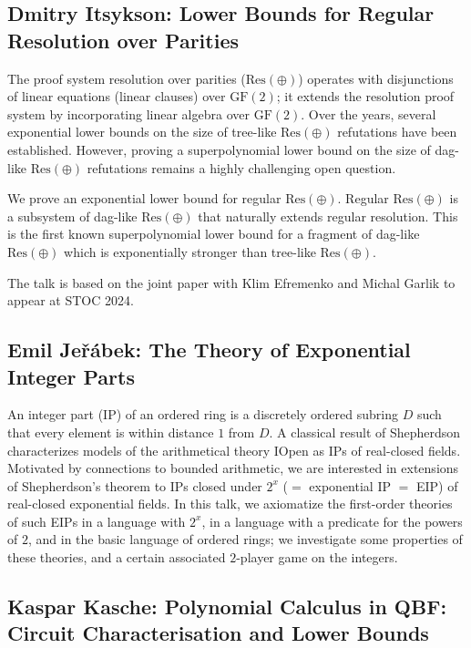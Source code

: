 \documentclass[11pt]{article}
\begin{document}
\subsection*{Dmitry Itsykson: Lower Bounds for Regular Resolution over Parities}\label{Itsykson}

The proof system resolution over parities ($\mathrm{Res}(\oplus)$) operates with disjunctions of linear equations (linear clauses) over $\mathrm{GF}(2)$; it extends the resolution proof system by incorporating linear algebra over $\mathrm{GF}(2)$. Over the years, several exponential lower bounds on the size of tree-like $\mathrm{Res}(\oplus)$ refutations have been established. However, proving a superpolynomial lower bound on the size of dag-like $\mathrm{Res}(\oplus)$ refutations remains a highly challenging open question.

We prove an exponential lower bound for regular $\mathrm{Res}(\oplus)$. Regular $\mathrm{Res}(\oplus)$ is a subsystem of dag-like $\mathrm{Res}(\oplus)$ that naturally extends regular resolution. This is the first known superpolynomial lower bound for a fragment of dag-like $\mathrm{Res}(\oplus)$ which is exponentially stronger than tree-like $\mathrm{Res}(\oplus)$.

The talk is based on the joint paper with Klim Efremenko and Michal Garlik to appear at STOC 2024.

\subsection*{Emil Je\v{r}\'{a}bek: The Theory of Exponential Integer Parts}\label{Jerabek}

An integer part (IP) of an ordered ring is a discretely ordered
subring $D$ such that every element is within distance $1$ from $D$.
A classical result of Shepherdson characterizes models of the
arithmetical theory IOpen as IPs of real-closed fields. Motivated by
connections to bounded arithmetic, we are interested in extensions of
Shepherdson's theorem to IPs closed under $2^x$ ($=$ exponential IP $=$ EIP)
of real-closed exponential fields. In this talk, we axiomatize the
first-order theories of such EIPs in a language with $2^x$, in a language
with a predicate for the powers of $2$, and in the basic language of
ordered rings; we investigate some properties of these theories, and
a certain associated $2$-player game on the integers.


\subsection*{Kaspar Kasche: Polynomial Calculus in QBF: Circuit Characterisation and
Lower Bounds}\label{Kasche}
\end{document}
